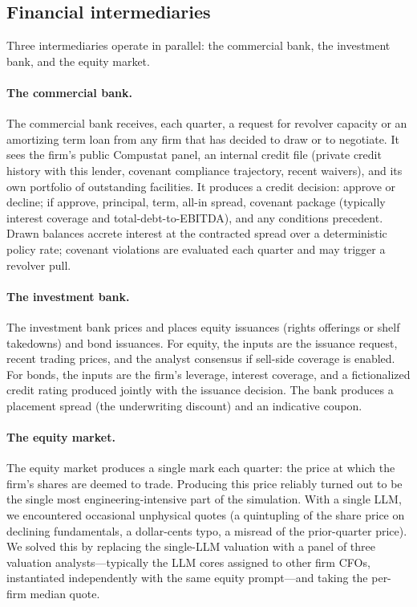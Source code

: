\documentclass[11pt]{article}
\begin{document}
\subsection{Financial intermediaries}

Three intermediaries operate in parallel: the commercial bank, the
investment bank, and the equity market.

\paragraph{The commercial bank.} The commercial bank receives, each
quarter, a request for revolver capacity or an amortizing term loan from
any firm that has decided to draw or to negotiate. It sees the firm's
public Compustat panel, an internal credit file (private credit history
with this lender, covenant compliance trajectory, recent waivers), and
its own portfolio of outstanding facilities. It produces a credit
decision: approve or decline; if approve, principal, term, all-in spread,
covenant package (typically interest coverage and total-debt-to-EBITDA),
and any conditions precedent. Drawn balances accrete interest at the
contracted spread over a deterministic policy rate; covenant violations
are evaluated each quarter and may trigger a revolver pull.

\paragraph{The investment bank.} The investment bank prices and places
equity issuances (rights offerings or shelf takedowns) and bond
issuances. For equity, the inputs are the issuance request, recent
trading prices, and the analyst consensus if sell-side coverage is
enabled. For bonds, the inputs are the firm's leverage, interest
coverage, and a fictionalized credit rating produced jointly with the
issuance decision. The bank produces a placement spread (the
underwriting discount) and an indicative coupon.

\paragraph{The equity market.} The equity market produces a single mark
each quarter: the price at which the firm's shares are deemed to trade.
Producing this price reliably turned out to be the single most
engineering-intensive part of the simulation. With a single LLM, we
encountered occasional unphysical quotes (a quintupling of the share
price on declining fundamentals, a dollar-cents typo, a misread of the
prior-quarter price). We solved this by replacing the single-LLM
valuation with a panel of three valuation analysts---typically the
LLM cores assigned to other firm CFOs, instantiated independently with
the same equity prompt---and taking the per-firm median quote.
\end{document}
